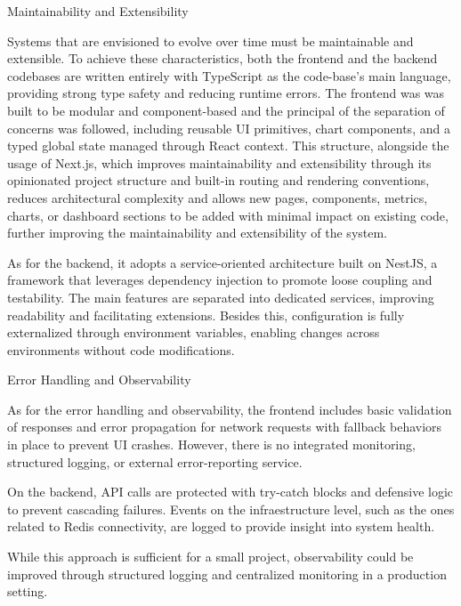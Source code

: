 \documentclass[12pt,reqno, twoside]{amsbook}
\makeatletter
\def\subsubsection{\@startsection{subsubsection}{3}%
      \z@{.5\linespacing\@plus.7\linespacing}{.25\linespacing}%
      {\normalfont\bfseries\flushleft}}
\theoremstyle{plain}
\numberwithin{equation}{chapter}
\numberwithin{section}{chapter}
\makeatother
\begin{document}
\subsubsection{Maintainability and Extensibility}

Systems that are envisioned to evolve over time must be maintainable and extensible. To achieve these characteristics, both the 
frontend and the backend codebases are written entirely with TypeScript as the code-base's main language, providing strong type 
safety and reducing runtime errors. The frontend was was built to be modular and component-based and the 
principal of the separation of concerns was followed, including reusable UI primitives, chart components, and a typed global state 
managed through React context. This structure, alongside the usage of Next.js, which improves maintainability and extensibility 
through its opinionated project structure and built-in routing and rendering conventions, reduces architectural complexity and 
allows new pages, components, metrics, charts, or dashboard sections to be added with minimal impact on existing code, further 
improving the maintainability and extensibility of the system.

As for the backend, it adopts a service-oriented architecture built on NestJS, a framework that leverages dependency injection to
 promote loose coupling and testability. The main features are separated into dedicated services, improving readability and 
 facilitating extensions. Besides this, configuration is fully externalized through environment variables, enabling changes across 
 environments without code modifications.

\subsubsection{Error Handling and Observability}

As for the error handling and observability, the frontend includes basic validation of responses and error propagation for network 
requests with fallback behaviors in place to prevent UI crashes. However, there is no integrated monitoring, structured logging, or 
external error-reporting service.

On the backend, API calls are protected with try-catch blocks and defensive logic to prevent cascading failures. Events on the 
infraestructure level, such as the ones related to Redis connectivity, are logged to provide insight into system health. 

While this approach is sufficient for a small project, observability could be improved through structured logging and centralized 
monitoring in a production setting.
\end{document}
